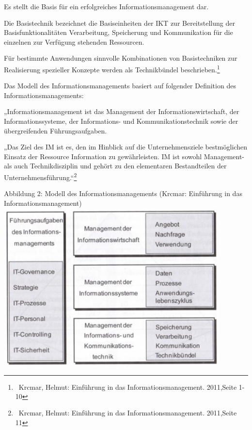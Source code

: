 \documentclass{article}
\begin{document}
Es stellt die Basis für ein erfolgreiches Informationsmanagement dar.

Die Basistechnik bezeichnet die Basiseinheiten der IKT zur Bereitstellung der Basisfunktionalitäten Verarbeitung,
Speicherung und Kommunikation für die einzelnen zur Verfügung stehenden Ressourcen.

Für bestimmte Anwendungen sinnvolle Kombinationen von Basistechniken zur Realisierung spezieller Konzepte werden als
Technikbündel beschrieben.\footnote{\ Krcmar, Helmut: Einführung in das Informationsmanagement. 2011,Seite
1-10}\newline


\newline
Das Modell des Informationsmanagements basiert auf folgender Definition des Informationsmanagements:

„Informationsmanagement ist das Management der Informationswirtschaft, der Informationssysteme, der Informations- und
Kommunikationstechnik sowie der übergreifenden Führungsaufgaben.

„Das Ziel des IM ist es, den im Hinblick auf die Unternehmensziele bestmöglichen Einsatz der Ressource Information zu
gewährleisten. IM ist sowohl Management- als auch Technikdisziplin und gehört zu den elementaren Bestandteilen der
Unternehmensführung.“\footnote{\ Krcmar, Helmut: Einführung in das Informationsmanagement. 2011,Seite 11}



\begin{center}
\begin{minipage}{12.081cm}
Abbildung 2: Modell des Informationsmanagements (Krcmar: Einführung in das Informationsmanagement)
\includegraphics[width=11.716cm,height=8.622cm]{ErsterEntwurfderHausarbeitAlina-img/ErsterEntwurfderHausarbeitAlina-img002.pdf}\end{minipage}
\end{center}
\end{document}
